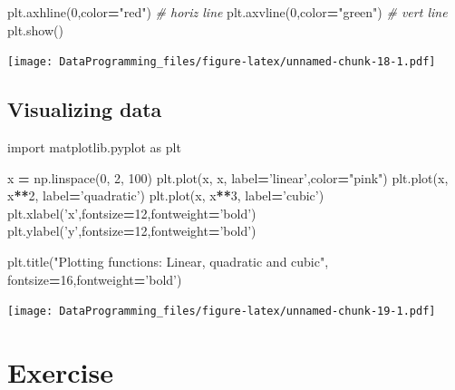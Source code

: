 \documentclass[]{book}
\newenvironment{Shaded}{\begin{snugshade}}{\end{snugshade}}
\newcommand{\CommentTok}[1]{\textcolor[rgb]{0.56,0.35,0.01}{\textit{#1}}}
\newcommand{\DecValTok}[1]{\textcolor[rgb]{0.00,0.00,0.81}{#1}}
\newcommand{\ImportTok}[1]{#1}
\newcommand{\NormalTok}[1]{#1}
\newcommand{\OperatorTok}[1]{\textcolor[rgb]{0.81,0.36,0.00}{\textbf{#1}}}
\newcommand{\StringTok}[1]{\textcolor[rgb]{0.31,0.60,0.02}{#1}}
\begin{document}
\begin{Shaded}
\begin{Highlighting}[]
\NormalTok{plt.axhline(}\DecValTok{0}\NormalTok{,color}\OperatorTok{=}\StringTok{"red"}\NormalTok{) }\CommentTok{# horiz line}
\NormalTok{plt.axvline(}\DecValTok{0}\NormalTok{,color}\OperatorTok{=}\StringTok{"green"}\NormalTok{) }\CommentTok{# vert line}
\NormalTok{plt.show()}
\end{Highlighting}
\end{Shaded}

\texttt{[image: DataProgramming\_files/figure-latex/unnamed-chunk-18-1.pdf]}

\hypertarget{visualizing-data}{%
\subsection{Visualizing data}\label{visualizing-data}}

\begin{Shaded}
\begin{Highlighting}[]

\ImportTok{import}\NormalTok{ matplotlib.pyplot }\ImportTok{as}\NormalTok{ plt}

\NormalTok{x }\OperatorTok{=}\NormalTok{ np.linspace(}\DecValTok{0}\NormalTok{, }\DecValTok{2}\NormalTok{, }\DecValTok{100}\NormalTok{)}
\NormalTok{plt.plot(x, x, label}\OperatorTok{=}\StringTok{'linear'}\NormalTok{,color}\OperatorTok{=}\StringTok{"pink"}\NormalTok{)}
\NormalTok{plt.plot(x, x}\OperatorTok{**}\DecValTok{2}\NormalTok{, label}\OperatorTok{=}\StringTok{'quadratic'}\NormalTok{)}
\NormalTok{plt.plot(x, x}\OperatorTok{**}\DecValTok{3}\NormalTok{, label}\OperatorTok{=}\StringTok{'cubic'}\NormalTok{)}
\NormalTok{plt.xlabel(}\StringTok{'x'}\NormalTok{,fontsize}\OperatorTok{=}\DecValTok{12}\NormalTok{,fontweight}\OperatorTok{=}\StringTok{'bold'}\NormalTok{)}
\NormalTok{plt.ylabel(}\StringTok{'y'}\NormalTok{,fontsize}\OperatorTok{=}\DecValTok{12}\NormalTok{,fontweight}\OperatorTok{=}\StringTok{'bold'}\NormalTok{)}

\NormalTok{plt.title(}\StringTok{"Plotting functions: Linear, quadratic and cubic"}\NormalTok{, fontsize}\OperatorTok{=}\DecValTok{16}\NormalTok{,fontweight}\OperatorTok{=}\StringTok{'bold'}\NormalTok{)}
\end{Highlighting}
\end{Shaded}

\texttt{[image: DataProgramming\_files/figure-latex/unnamed-chunk-19-1.pdf]}

\hypertarget{exercise-1}{%
\section{Exercise}\label{exercise-1}}
\end{document}
